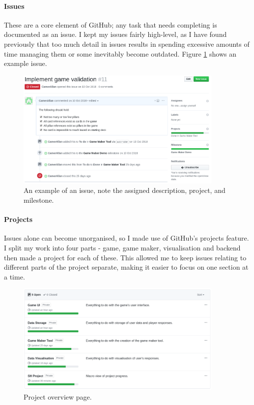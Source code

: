 \paragraph{Issues} These are a core element of GitHub; any task that needs completing is documented as an issue.
I kept my issues fairly high-level, as I have found previously that too much detail in issues results in spending excessive amounts of time managing them or some inevitably become outdated. Figure \ref{fig:issue} shows an example issue.

\begin{figure}[!h]
	\centering
	\includegraphics[width=0.9\textwidth]{./images/softeng/issue.png}
	\caption{An example of an issue, note the assigned description, project, and milestone.}
	\label{fig:issue}
\end{figure}

\paragraph{Projects} Issues alone can become unorganised, so I made use of GitHub's projects feature. 
I split my work into four parts - game, game maker, visualisation and backend then made a project for each of these. 
This allowed me to keep issues relating to different parts of the project separate, making it easier to focus on one section at a time.

\begin{figure}[!h]
	\centering
	\includegraphics[width=0.9\textwidth]{./images/softeng/projects.png}
	\caption{Project overview page.}
	\label{fig:projects}
\end{figure}

